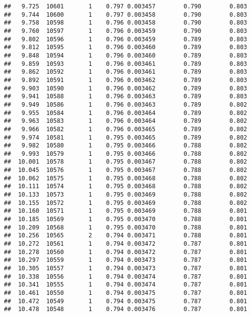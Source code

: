 \documentclass[
]{book}
\begin{document}
\begin{verbatim}
##   9.725  10601       1    0.797 0.003457        0.790        0.803
##   9.744  10600       1    0.797 0.003458        0.790        0.803
##   9.758  10598       1    0.796 0.003458        0.790        0.803
##   9.760  10597       1    0.796 0.003459        0.790        0.803
##   9.802  10596       1    0.796 0.003459        0.789        0.803
##   9.812  10595       1    0.796 0.003460        0.789        0.803
##   9.848  10594       1    0.796 0.003460        0.789        0.803
##   9.859  10593       1    0.796 0.003461        0.789        0.803
##   9.862  10592       1    0.796 0.003461        0.789        0.803
##   9.892  10591       1    0.796 0.003462        0.789        0.803
##   9.903  10590       1    0.796 0.003462        0.789        0.803
##   9.941  10588       1    0.796 0.003463        0.789        0.803
##   9.949  10586       1    0.796 0.003463        0.789        0.802
##   9.955  10584       1    0.796 0.003464        0.789        0.802
##   9.963  10583       1    0.796 0.003464        0.789        0.802
##   9.966  10582       1    0.796 0.003465        0.789        0.802
##   9.974  10581       1    0.795 0.003465        0.789        0.802
##   9.982  10580       1    0.795 0.003466        0.788        0.802
##   9.993  10579       1    0.795 0.003466        0.788        0.802
##  10.001  10578       1    0.795 0.003467        0.788        0.802
##  10.045  10576       1    0.795 0.003467        0.788        0.802
##  10.062  10575       1    0.795 0.003468        0.788        0.802
##  10.111  10574       1    0.795 0.003468        0.788        0.802
##  10.133  10573       1    0.795 0.003469        0.788        0.802
##  10.155  10572       1    0.795 0.003469        0.788        0.802
##  10.160  10571       1    0.795 0.003469        0.788        0.801
##  10.185  10569       1    0.795 0.003470        0.788        0.801
##  10.209  10568       1    0.795 0.003470        0.788        0.801
##  10.256  10565       2    0.794 0.003471        0.788        0.801
##  10.272  10561       1    0.794 0.003472        0.787        0.801
##  10.278  10560       1    0.794 0.003472        0.787        0.801
##  10.297  10559       1    0.794 0.003473        0.787        0.801
##  10.305  10557       1    0.794 0.003473        0.787        0.801
##  10.338  10556       1    0.794 0.003474        0.787        0.801
##  10.341  10555       1    0.794 0.003474        0.787        0.801
##  10.461  10550       1    0.794 0.003475        0.787        0.801
##  10.472  10549       1    0.794 0.003475        0.787        0.801
##  10.478  10548       1    0.794 0.003476        0.787        0.801

\end{verbatim}
\end{document}
